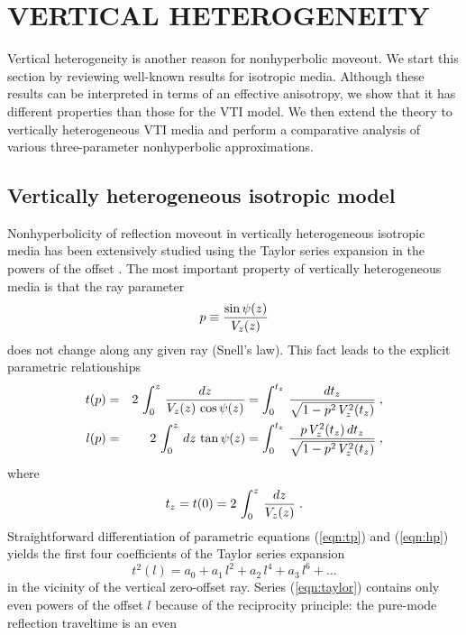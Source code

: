\section{VERTICAL HETEROGENEITY}
Vertical heterogeneity is another reason for nonhyperbolic
moveout. We start this section by reviewing well-known results for
isotropic media. Although these results can be interpreted
in terms of an effective anisotropy, we show that it has different properties
than those for the VTI model. We then extend the theory to vertically heterogeneous
VTI media and perform a comparative analysis of various three-parameter 
nonhyperbolic approximations.


\subsection{Vertically heterogeneous isotropic model} 
Nonhyperbolicity of reflection moveout in vertically heterogeneous
isotropic media has been extensively studied using the
Taylor series expansion in the powers of the offset
\cite[]{der,taner,GPR21-04-07830795}. The most important property of
vertically heterogeneous media is that the ray parameter 
\[
p \equiv {{\sin{\psi}(z)} \over {V_z(z)}}
\]
does not change along
any given ray (Snell's law). This fact leads to the explicit parametric
relationships 
\begin{eqnarray}
t(p) & = & 2\,\int_{0}^{z}\,{{dz} \over {V_z(z)\,\cos{\psi(z)}}} =
\int_{0}^{t_z}\,{{dt_z} \over {\sqrt{1 - p^2\,V_z^2(t_z)}}}\;,
\label{eqn:tp} \\ 
l(p) & = & 2\,\int_{0}^{z}\,{{dz}\,\tan{\psi(z)}} =
\int_{0}^{t_z}\,{{p\,V_z^2(t_z)\,dt_z} \over 
{\sqrt{1 - p^2\,V_z^2(t_z)}}}\;,
\label{eqn:hp}
\end{eqnarray}
where
\begin{equation}
t_z = t(0) = 2\,\int_{0}^{z}\,{{dz} \over {V_z(z)}}\;.
\label{eqn:tz}
\end{equation}
Straightforward differentiation of parametric equations (\ref{eqn:tp})
and (\ref{eqn:hp}) yields the first four coefficients of the Taylor
series expansion
\begin{equation}
t^2(l) = a_0 + a_1\,l^2 + a_2\,l^4 + a_3\,l^6 + \ldots
\label{eqn:taylor}
\end{equation}
in the vicinity of the vertical zero-offset ray.  Series
(\ref{eqn:taylor}) contains only even powers of the offset $l$ because
of the reciprocity principle: the pure-mode reflection traveltime is an even

